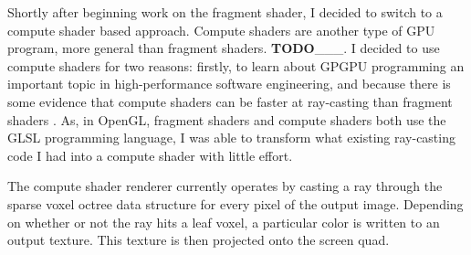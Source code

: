 Shortly after beginning work on the fragment shader, I decided to switch to a compute shader based approach. Compute shaders are another type of GPU program, more general than fragment shaders. \textbf{TODO}\_\_\_. I decided to use compute shaders for two reasons: firstly, to learn about GPGPU programming an important topic in high-performance software engineering, and because there is some evidence that compute shaders can be faster at ray-casting than fragment shaders \autocite{francisco2017comparison}. As, in OpenGL, fragment shaders and compute shaders both use the GLSL programming language, I was able to transform what existing ray-casting code I had into a compute shader with little effort. 

The compute shader renderer currently operates by casting a ray through the sparse voxel octree data structure for every pixel of the output image. Depending on whether or not the ray hits a leaf voxel, a particular color is written to an output texture. This texture is then projected onto the screen quad. 
